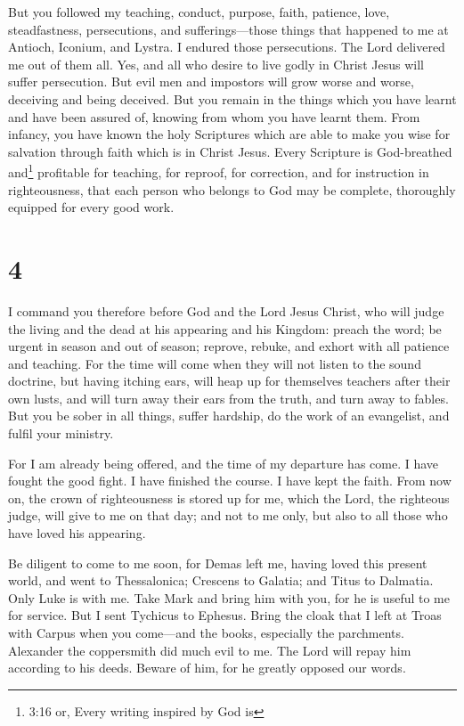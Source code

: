  But you followed my teaching, conduct, purpose, faith,
patience, love, steadfastness,  persecutions, and
sufferings---those things that happened to me at Antioch, Iconium, and
Lystra. I endured those persecutions. The Lord delivered me out of them
all.  Yes, and all who desire to live godly in Christ Jesus
will suffer persecution.  But evil men and impostors will
grow worse and worse, deceiving and being deceived.  But
you remain in the things which you have learnt and have been assured of,
knowing from whom you have learnt them.  From infancy, you
have known the holy Scriptures which are able to make you wise for
salvation through faith which is in Christ Jesus.  Every
Scripture is God-breathed and\footnote{3:16 or, Every writing inspired
  by God is} profitable for teaching, for reproof, for correction, and
for instruction in righteousness,  that each person who
belongs to God may be complete, thoroughly equipped for every good work.

\hypertarget{section-3}{%
\section{4}\label{section-3}}

 I command you therefore before God and the Lord Jesus
Christ, who will judge the living and the dead at his appearing and his
Kingdom:  preach the word; be urgent in season and out of
season; reprove, rebuke, and exhort with all patience and teaching.
 For the time will come when they will not listen to the
sound doctrine, but having itching ears, will heap up for themselves
teachers after their own lusts,  and will turn away their
ears from the truth, and turn away to fables.  But you be
sober in all things, suffer hardship, do the work of an evangelist, and
fulfil your ministry.

 For I am already being offered, and the time of my
departure has come.  I have fought the good fight. I have
finished the course. I have kept the faith.  From now on,
the crown of righteousness is stored up for me, which the Lord, the
righteous judge, will give to me on that day; and not to me only, but
also to all those who have loved his appearing.

 Be diligent to come to me soon,  for Demas
left me, having loved this present world, and went to Thessalonica;
Crescens to Galatia; and Titus to Dalmatia.  Only Luke is
with me. Take Mark and bring him with you, for he is useful to me for
service.  But I sent Tychicus to Ephesus. 
Bring the cloak that I left at Troas with Carpus when you come---and the
books, especially the parchments.  Alexander the
coppersmith did much evil to me. The Lord will repay him according to
his deeds.  Beware of him, for he greatly opposed our
words.

